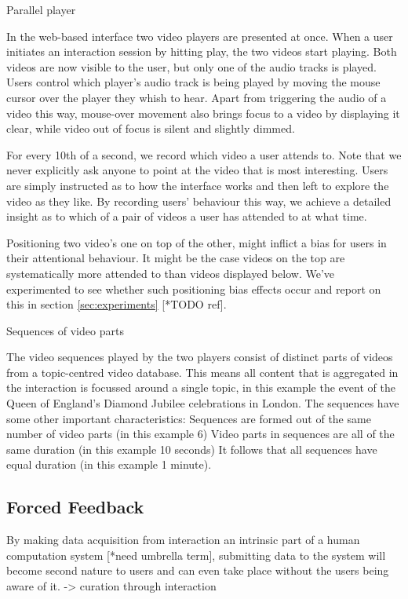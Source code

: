 % 
% 
% 


Parallel player

In the web-based interface two video players are presented at once. When a user initiates an interaction session by hitting play, the two videos start playing. Both videos are now visible to the user, but only one of the audio tracks is played. Users control which player's audio track is being played by moving the mouse cursor over the player they whish to hear. Apart from triggering the audio of a video this way, mouse-over movement also brings focus to a video by displaying it clear, while video out of focus is silent and slightly dimmed.

For every 10th of a second, we record which video a user attends to. Note that we never explicitly ask anyone to point at the video that is most interesting. Users are simply instructed as to how the interface works and then left to explore the video as they like. By recording users' behaviour this way, we achieve a detailed insight as to which of a pair of videos a user has attended to at what time.

Positioning two video's one on top of the other, might inflict a bias for users in their attentional behaviour. It might be the case videos on the top are systematically more attended to than videos displayed below. We've experimented to see whether such positioning bias effects occur and report on this in section \ref{sec:experiments} [*TODO ref].

Sequences of video parts

The video sequences played by the two players consist of distinct parts of videos from a topic-centred video database. This means all content that is aggregated in the interaction is focussed around a single topic, in this example the event of the Queen of England's Diamond Jubilee celebrations in London. The sequences have some other important characteristics:
Sequences are formed out of the same number of video parts (in this example 6)
Video parts in sequences are all of the same duration (in this example 10 seconds)
It follows that all sequences have equal duration (in this example 1 minute).




\subsection{Forced Feedback}
By making data acquisition from interaction an intrinsic part of a human computation system [*need umbrella term], submitting data to the system will become second nature to users and can even take place without the users being aware of it.
	-> curation through interaction


